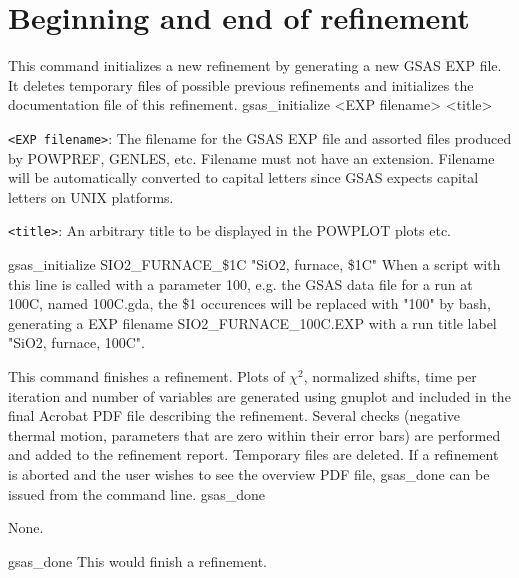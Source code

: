%
%

\section{Beginning and end of refinement}


{
This command initializes a new refinement by generating a new GSAS EXP file. It deletes temporary files of possible previous refinements and initializes the documentation file of this refinement.
}{
gsas\_initialize <EXP filename> <title>
}{
\item \texttt{<EXP filename>}: The filename for the GSAS EXP file and assorted files produced by POWPREF, GENLES, etc. Filename must not have an extension. Filename will be automatically converted to capital letters since GSAS expects capital letters on UNIX platforms.
\item \texttt{<title>}: An arbitrary title to be displayed in the POWPLOT plots etc.
}{
gsas\_initialize SIO2\_FURNACE\_\$1C "SiO2, furnace, \$1C"
}{
When a script with this line is called with a parameter 100, e.g. the GSAS data file for a run at  100C, 
named 100C.gda, the \$1 occurences will be replaced with "100" by bash, generating a EXP filename 
SIO2\_FURNACE\_100C.EXP with a run title label "SiO2, furnace, 100C".
}

{
This command finishes a refinement. Plots of $\chi^2$, normalized shifts, time per iteration and number of variables are generated using gnuplot and included in the final Acrobat PDF file describing the refinement. Several checks (negative thermal motion, parameters that are zero within their error bars) are performed and added to the refinement report. Temporary files are deleted. If a refinement is aborted and the user wishes to see the overview PDF file, gsas\_done can be issued from the command line.
}{
gsas\_done
}{
\item None.
}{
gsas\_done
}{
This would finish a refinement.
}


